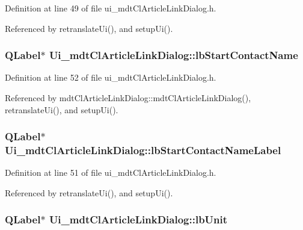 Definition at line 49 of file ui\-\_\-mdt\-Cl\-Article\-Link\-Dialog.\-h.



Referenced by retranslate\-Ui(), and setup\-Ui().

\hypertarget{class_ui__mdt_cl_article_link_dialog_a2f05b301e14e0b34f4b38d65c2822ab2}{
\subsubsection[{lb\-Start\-Contact\-Name}]{\setlength{\rightskip}{0pt plus 5cm}Q\-Label$\ast$ Ui\-\_\-mdt\-Cl\-Article\-Link\-Dialog\-::lb\-Start\-Contact\-Name}}\label{class_ui__mdt_cl_article_link_dialog_a2f05b301e14e0b34f4b38d65c2822ab2}


Definition at line 52 of file ui\-\_\-mdt\-Cl\-Article\-Link\-Dialog.\-h.



Referenced by mdt\-Cl\-Article\-Link\-Dialog\-::mdt\-Cl\-Article\-Link\-Dialog(), retranslate\-Ui(), and setup\-Ui().

\hypertarget{class_ui__mdt_cl_article_link_dialog_a777f67de9fb9cdb8e8e862695f07eb3e}{
\subsubsection[{lb\-Start\-Contact\-Name\-Label}]{\setlength{\rightskip}{0pt plus 5cm}Q\-Label$\ast$ Ui\-\_\-mdt\-Cl\-Article\-Link\-Dialog\-::lb\-Start\-Contact\-Name\-Label}}\label{class_ui__mdt_cl_article_link_dialog_a777f67de9fb9cdb8e8e862695f07eb3e}


Definition at line 51 of file ui\-\_\-mdt\-Cl\-Article\-Link\-Dialog.\-h.



Referenced by retranslate\-Ui(), and setup\-Ui().

\hypertarget{class_ui__mdt_cl_article_link_dialog_a16eae76f4a5b7309cd4e7ac12a9e9e77}{
\subsubsection[{lb\-Unit}]{\setlength{\rightskip}{0pt plus 5cm}Q\-Label$\ast$ Ui\-\_\-mdt\-Cl\-Article\-Link\-Dialog\-::lb\-Unit}}\label{class_ui__mdt_cl_article_link_dialog_a16eae76f4a5b7309cd4e7ac12a9e9e77}


